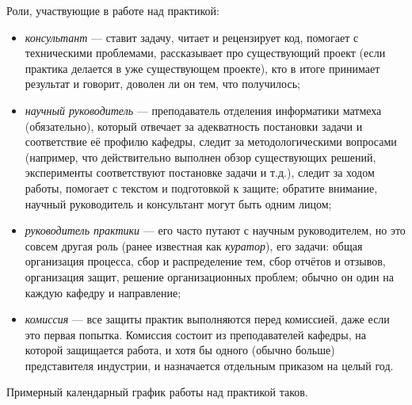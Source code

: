 \documentclass{article}
\begin{document}
Роли, участвующие в работе над практикой:
\begin{itemize}
    \item \textit{консультант} --- ставит задачу, читает и рецензирует код, помогает с техническими проблемами, рассказывает про существующий проект (если практика делается в уже существующем проекте), кто в итоге принимает результат и говорит, доволен ли он тем, что получилось;
    \item \textit{научный руководитель} --- преподаватель отделения информатики матмеха (обязательно), который отвечает за адекватность постановки задачи и соответствие её профилю кафедры, следит за методологическими вопросами (например, что действительно выполнен обзор существующих решений, эксперименты соответствуют постановке задачи и т.д.), следит за ходом работы, помогает с текстом и подготовкой к защите; обратите внимание, научный руководитель и консультант могут быть одним лицом;
    \item \textit{руководитель практики} --- его часто путают с научным руководителем, но это совсем другая роль (ранее известная как \textit{куратор}), его задачи: общая организация процесса, сбор и распределение тем, сбор отчётов и отзывов, организация защит, решение организационных проблем; обычно он один на каждую кафедру и направление;
    \item \textit{комиссия} --- все защиты практик выполняются перед комиссией, даже если это первая попытка. Комиссия состоит из преподавателей кафедры, на которой защищается работа, и хотя бы одного (обычно больше) представителя индустрии, и назначается отдельным приказом на целый год.
\end{itemize}

Примерный календарный график работы над практикой таков.
\end{document}
